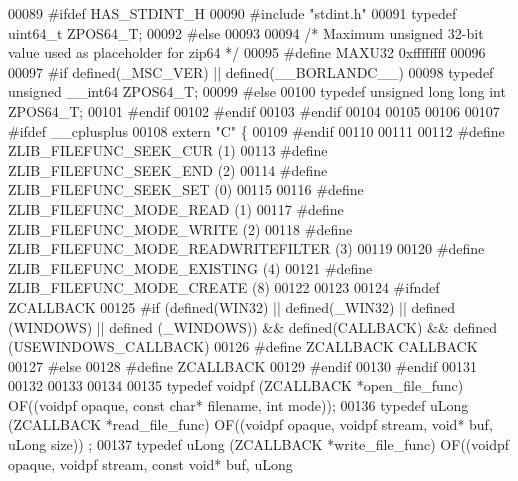 \begin{DoxyCode}
00089 \textcolor{preprocessor}{#ifdef HAS\_STDINT\_H}
00090 \textcolor{preprocessor}{#include "stdint.h"}
00091 \textcolor{keyword}{typedef} uint64\_t ZPOS64\_T;
00092 \textcolor{preprocessor}{#else}
00093 
00094 \textcolor{comment}{/* Maximum unsigned 32-bit value used as placeholder for zip64 */}
00095 \textcolor{preprocessor}{#define MAXU32 0xffffffff}
00096 
00097 \textcolor{preprocessor}{#if defined(\_MSC\_VER) || defined(\_\_BORLANDC\_\_)}
00098 \textcolor{keyword}{typedef} \textcolor{keywordtype}{unsigned} \_\_int64 ZPOS64\_T;
00099 \textcolor{preprocessor}{#else}
00100 \textcolor{keyword}{typedef} \textcolor{keywordtype}{unsigned} \textcolor{keywordtype}{long} \textcolor{keywordtype}{long} \textcolor{keywordtype}{int} ZPOS64\_T;
00101 \textcolor{preprocessor}{#endif}
00102 \textcolor{preprocessor}{#endif}
00103 \textcolor{preprocessor}{#endif}
00104 
00105 
00106 
00107 \textcolor{preprocessor}{#ifdef \_\_cplusplus}
00108 \textcolor{keyword}{extern} \textcolor{stringliteral}{"C"} \{
00109 \textcolor{preprocessor}{#endif}
00110 
00111 
00112 \textcolor{preprocessor}{#define ZLIB\_FILEFUNC\_SEEK\_CUR (1)}
00113 \textcolor{preprocessor}{#define ZLIB\_FILEFUNC\_SEEK\_END (2)}
00114 \textcolor{preprocessor}{#define ZLIB\_FILEFUNC\_SEEK\_SET (0)}
00115 
00116 \textcolor{preprocessor}{#define ZLIB\_FILEFUNC\_MODE\_READ      (1)}
00117 \textcolor{preprocessor}{#define ZLIB\_FILEFUNC\_MODE\_WRITE     (2)}
00118 \textcolor{preprocessor}{#define ZLIB\_FILEFUNC\_MODE\_READWRITEFILTER (3)}
00119 
00120 \textcolor{preprocessor}{#define ZLIB\_FILEFUNC\_MODE\_EXISTING (4)}
00121 \textcolor{preprocessor}{#define ZLIB\_FILEFUNC\_MODE\_CREATE   (8)}
00122 
00123 
00124 \textcolor{preprocessor}{#ifndef ZCALLBACK}
00125 \textcolor{preprocessor}{ #if (defined(WIN32) || defined(\_WIN32) || defined (WINDOWS) || defined (\_WINDOWS)) && defined(CALLBACK) &&
       defined (USEWINDOWS\_CALLBACK)}
00126 \textcolor{preprocessor}{   #define ZCALLBACK CALLBACK}
00127 \textcolor{preprocessor}{ #else}
00128 \textcolor{preprocessor}{   #define ZCALLBACK}
00129 \textcolor{preprocessor}{ #endif}
00130 \textcolor{preprocessor}{#endif}
00131 
00132 
00133 
00134 
00135 \textcolor{keyword}{typedef} voidpf   (ZCALLBACK *open\_file\_func)      OF((voidpf opaque, \textcolor{keyword}{const} \textcolor{keywordtype}{char}* filename, \textcolor{keywordtype}{int} mode));
00136 \textcolor{keyword}{typedef} uLong    (ZCALLBACK *read\_file\_func)      OF((voidpf opaque, voidpf stream, \textcolor{keywordtype}{void}* buf, uLong size))
      ;
00137 \textcolor{keyword}{typedef} uLong    (ZCALLBACK *write\_file\_func)     OF((voidpf opaque, voidpf stream, \textcolor{keyword}{const} \textcolor{keywordtype}{void}* buf, uLong 

\end{DoxyCode}
